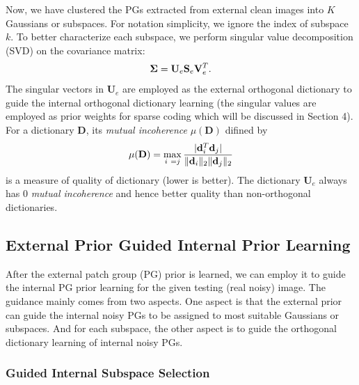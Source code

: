 \documentclass[10pt,twocolumn,letterpaper]{article}
\begin{document}
Now, we have clustered the PGs extracted from external clean images into $K$ Gaussians or subspaces. For notation simplicity, we ignore the index of subspace $k$. To better characterize each subspace, we perform singular value decomposition (SVD) on the covariance matrix:
\vspace{-2mm}
\begin{equation}\label{equ3}\vspace{-2mm}
\mathbf{\Sigma}=\mathbf{U}_{e}\mathbf{S}_{e}\mathbf{V}_{e}^{T}.
\end{equation}
The singular vectors in $\mathbf{U}_{e}$ are employed as the external orthogonal dictionary to guide the internal orthogonal dictionary learning (the singular values are employed as prior weights for sparse coding which will be discussed in Section 4). For a dictionary $\mathbf{D}$, its \emph{mutual incoherence} $\mu(\mathbf{D})$ \cite{donoho2003optimally} difined by
\vspace{-2mm}
\begin{equation}\label{equ4}
\vspace{-2mm}
\mu(\mathbf{D})=\max_{i~=j}\frac{|\mathbf{d}_{i}^{T}\mathbf{d}_{j}|}{\|\mathbf{d}_{i}\|_{2}\|\mathbf{d}_{j}\|_{2}}
\end{equation} 
is a measure of quality of dictionary (lower is better). The dictionary $\mathbf{U}_{e}$ always has $0$
\emph{mutual incoherence} and hence better quality than non-orthogonal dictionaries.

\subsection{External Prior Guided Internal Prior Learning}

After the external patch group (PG) prior is learned, we can employ it to guide the internal PG prior learning for the given testing (real noisy) image. The guidance mainly comes from two aspects. One aspect is that the external prior can guide the internal noisy PGs to be assigned to most suitable Gaussians or subspaces. And for each subspace, the other aspect is to guide the orthogonal dictionary learning of internal noisy PGs.

\vspace{-2mm}
\subsubsection{Guided Internal Subspace Selection}
\vspace{-1mm}
\end{document}
